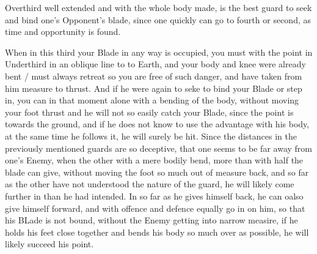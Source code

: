 Overthird well extended and with the whole body made, is the best
guard to seek and bind one's Opponent's blade, since one quickly can
go to fourth or second, as time and opportunity is found.

When in this third your Blade in any way is occupied, you must with
the point in Underthird in an oblique line to to Earth, and your body and knee were already bent /
must always retreat so you are free of such danger, and have taken
from him measure to thrust. And if he were again to seke to bind your
Blade or step in, you can in that moment alone with a bending of the
body, without moving your foot thrust and he will not so easily catch
your Blade, since the point is towards the ground, and if he does not
know to use the advantage with his body, at the same time he follows
it, he will surely be hit.
Since the distances in the previously mentioned guards are so
deceptive, that one seems to be far away from one's Enemy, when the
other with a mere bodily bend, more than with half the blade can give, without
moving the foot so much out of measure back, and so far as the other
have not understood the nature of the guard, he will likely come
further in than he had intended. In so far as he gives himself back,
he can oalso give himself forward, and with offence and defence
equally go in on him, so that his BLade is not bound, without the
Enemy getting into narrow measire, if he holds his feet close together
and bends his body so much over as possible, he will likely
succeed his point.
